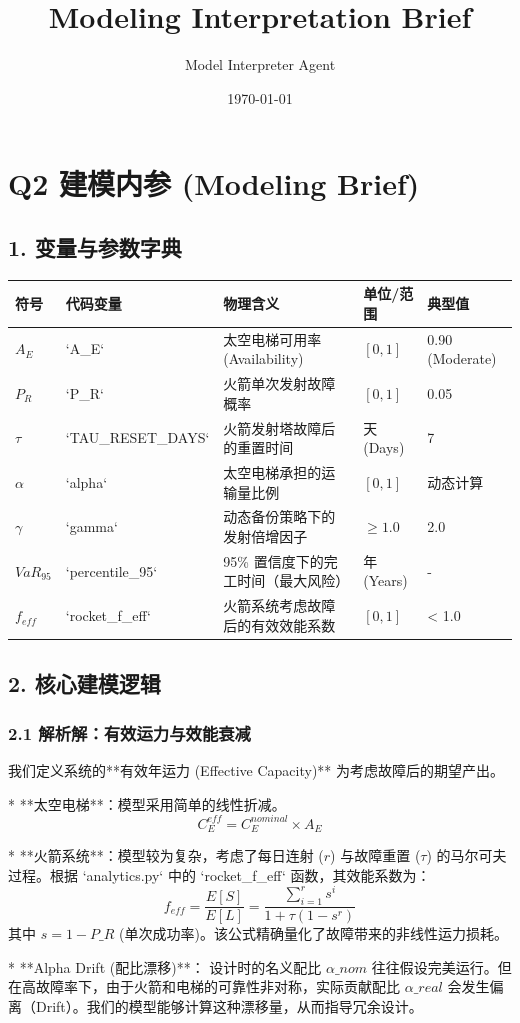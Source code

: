 \documentclass{article}
\title{Modeling Interpretation Brief}
\author{Model Interpreter Agent}
\date{\today}
\begin{document}
\maketitle
\section*{Q2 建模内参 (Modeling Brief)}
\par
\subsection*{1. 变量与参数字典}
\par
\begin{center}
\begin{longtable}{lllll}
\toprule
符号 & 代码变量 & 物理含义 & 单位/范围 & 典型值 \\
\midrule
$A_E$ & `A\_E` & 太空电梯可用率 (Availability) & $[0, 1]$ & 0.90 (Moderate) \\
$P_R$ & `P\_R` & 火箭单次发射故障概率 & $[0, 1]$ & 0.05 \\
$\tau$ & `TAU\_RESET\_DAYS` & 火箭发射塔故障后的重置时间 & 天 (Days) & 7 \\
$\alpha$ & `alpha` & 太空电梯承担的运输量比例 & $[0, 1]$ & 动态计算 \\
$\gamma$ & `gamma` & 动态备份策略下的发射倍增因子 & $\ge 1.0$ & 2.0 \\
$VaR_{95}$ & `percentile\_95` & 95\% 置信度下的完工时间（最大风险） & 年 (Years) & - \\
$f_{eff}$ & `rocket\_f\_eff` & 火箭系统考虑故障后的有效效能系数 & $[0, 1]$ & < 1.0 \\
\bottomrule
\end{longtable}
\end{center}
\par
\subsection*{2. 核心建模逻辑}
\par
\subsubsection*{2.1 解析解：有效运力与效能衰减}
我们定义系统的**有效年运力 (Effective Capacity)** 为考虑故障后的期望产出。
\par
*   **太空电梯**：模型采用简单的线性折减。
\[  C_E^{eff} = C_E^{nominal} \times A_E  \]
\par
*   **火箭系统**：模型较为复杂，考虑了每日连射 ($r$) 与故障重置 ($\tau$) 的马尔可夫过程。根据 `analytics.py` 中的 `rocket\_f\_eff` 函数，其效能系数为：
\[  f_{eff} = \frac{E[S]}{E[L]} = \frac{\sum_{i=1}^r s^i}{1 + \tau(1-s^r)}  \]
其中 $s = 1 - P\_R$ (单次成功率)。该公式精确量化了故障带来的非线性运力损耗。
\par
*   **Alpha Drift (配比漂移)**：
设计时的名义配比 $\alpha\_{nom}$ 往往假设完美运行。但在高故障率下，由于火箭和电梯的可靠性非对称，实际贡献配比 $\alpha\_{real}$ 会发生偏离（Drift）。我们的模型能够计算这种漂移量，从而指导冗余设计。
\par
\end{document}
